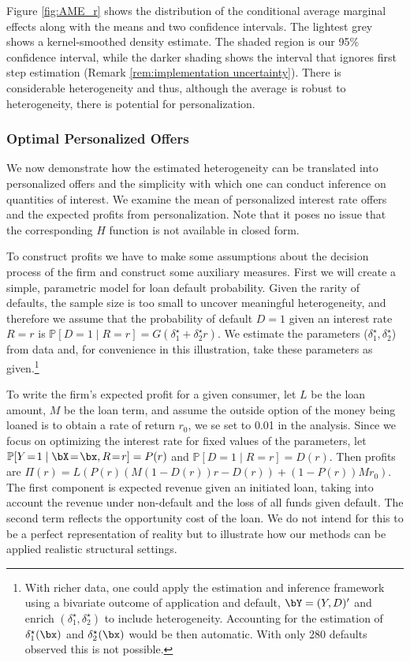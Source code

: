 \documentclass[12pt]{article}
\numberwithin{equation}{section}
\theoremstyle{definition}
\renewcommand{\P}{\mathbb{P}}
\newcommand{\dtrue}{\delta^\star}
\begin{document}
Figure \ref{fig:AME_r} shows the distribution of the conditional average marginal effects along with the means and two confidence intervals. The lightest grey shows a kernel-smoothed density estimate. The shaded region is our 95\% confidence interval, while the darker shading shows the interval that ignores first step estimation (Remark \ref{rem:implementation uncertainty}). There is considerable heterogeneity and thus, although the average is robust to heterogeneity, there is potential for personalization. 




\subsubsection{Optimal Personalized Offers}

We now demonstrate how the estimated heterogeneity can
be translated into personalized offers and the simplicity with which
one can conduct inference on quantities of interest. We examine the mean of personalized interest rate offers and the expected profits from personalization. Note that it poses no issue that the corresponding $H$ function is not available in closed form.

To construct profits we have to make some assumptions about the decision process of the firm and construct some auxiliary measures. First we will create a simple, parametric model for loan default probability. 
Given the rarity of defaults, the sample size is too small to uncover meaningful heterogeneity, and therefore we assume that the probability of default $D=1$ given an interest rate $R=r$ is $\P[D \!=\! 1 \mid R \!=\! r] = G(\dtrue_1 + \dtrue_2 r)$. 
We estimate the parameters ($\dtrue_1, \dtrue_2$) from data and, for convenience in this illustration, take these parameters as given.\footnote{With richer data, one could apply the estimation and inference framework using a bivariate outcome of application and default, $\bY = (Y,D)'$ and enrich $(\dtrue_1, \dtrue_2)$ to include heterogeneity. Accounting for the estimation of $\dtrue_1(\bx)$ and $\dtrue_2(\bx)$ would be then automatic. With only 280 defaults observed this is not possible.} 


To write the firm's expected profit for a given consumer, let $L$ be the loan amount, $M$ be the loan term, and assume the outside option of the money being loaned is to obtain a rate of return $r_0$, we se set to 0.01 in the analysis. Since we focus on optimizing the interest rate for fixed values of the parameters, let $\P[Y \!=\! 1 \mid \bX \!=\! \bx, R \!=\! r] = P(r)$ and $\P[D \!=\! 1 \mid R \!=\! r] = D(r)$. Then profits are
$
\Pi(r) = 
L (
P(r) ( M (1 - D(r)) r - D(r) )
+
(1 - P(r)) M r_0
)$.
The first component is expected revenue given an initiated loan, taking into account the revenue under non-default and the loss of all funds given default. The second term reflects the opportunity cost of the loan. We do not intend for this to be a perfect representation of reality but to illustrate how our methods can be applied realistic structural settings.
\end{document}
